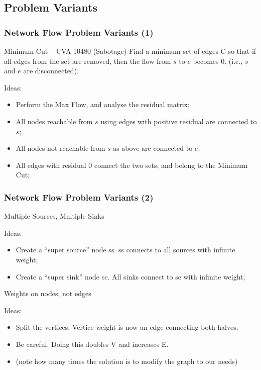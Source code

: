 \documentclass{beamer}
\begin{document}
\subsection{Problem Variants}
\begin{frame}
  \frametitle{Network Flow Problem Variants (1)}
  {\smaller
  \begin{block}{Minimum Cut -- UVA 10480 (Sabotage)}
    Find a minimum set of edges C so that if all edges from the set
    are removed, then the flow from $s$ to $e$ becomes 0. (i.e., $s$
    and $e$ are disconnected).
  \end{block}

  Ideas:
  \begin{itemize}
  \item Perform the Max Flow, and analyse the residual matrix;
  \item All nodes reachable from $s$ using edges with positive
    residual are connected to $s$;
  \item All nodes not reachable from $s$ as above are connected to $e$;
  \item All edges with residual $0$ connect the two sets, and belong
    to the Minimum Cut;
  \end{itemize}
  }
\end{frame}

\begin{frame}
  \frametitle{Network Flow Problem Variants (2)}
  {\smaller
    \begin{block}{Multiple Sources, Multiple Sinks}
    \end{block}

    Ideas:
    \begin{itemize}
    \item Create a ``super source'' node ss. ss connects to all sources with infinite weight;
    \item Create a ``super sink'' node se. All sinks connect to se with infinite weight;
    \end{itemize}

    \begin{block}{Weights on nodes, not edges}
    \end{block}
    Ideas:
    \begin{itemize}
    \item Split the vertices. Vertice weight is now an edge connecting both halves.
    \item Be careful. Doing this doubles V and increases E.
    \item (note how many times the solution is to modify the graph to our needs)
    \end{itemize}

  }
\end{frame}
\end{document}
